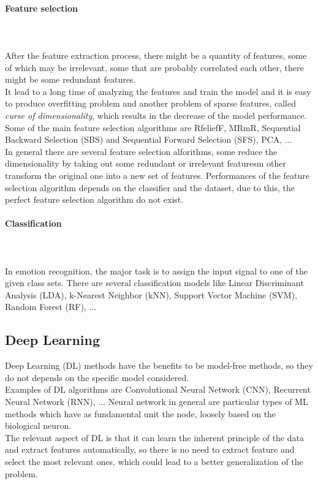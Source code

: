 \paragraph{Feature selection}
\mbox{} \\ \\ \indent
After the feature extraction process, there might be a quantity of features, some of which may be irrelevant, some that are probably correlated each other, there might be some redundant features.
\\
It lead to a long time of analyzing the features and train the model and it is easy to produce overfitting problem and another problem of sparse features, called \textit{curse of dimensionality}, which results in the decrease of the model performance.
\\
Some of the main feature selection algorithms are RfeliefF, MRmR, Sequential Backward Selection (SBS) and Sequential Forward Selection (SFS), PCA, ...
\\ \indent
In general there are several feature selection alforithms, some reduce the dimensionality by taking out some redundant or irrelevant featuresm other transform the original one into a new set of features. Performances of the feature selection algorithm depends on the classifier and the dataset, due to this, the perfect feature selection algorithm do not exist.

\paragraph{Classification}
\mbox{} \\ \\ \indent
In emotion recognition, the major task is to assign the input signal to one of the given class sets. There are several classification models like Linear Discriminant Analysis (LDA), k-Nearest Neighbor (kNN), Support Vector Machine (SVM), Random Forest (RF), ...

\subsection{Deep Learning}
Deep Learning (DL) methods have the benefits to be model-free methods, so they do not depends on the specific model considered.
\\
Examples of DL algorithms are Convolutional Neural Network (CNN), Recurrent Neural Network (RNN), ... Neural network in general are particular types of ML methods which have as fundamental unit the node, loosely based on the biological neuron. 
\\ \indent
The relevant aspect of DL is that it can learn the inherent principle of the data and extract features automatically, so there is no need to extract feature and select the most relevant ones, which could lead to a better generalization of the problem.


